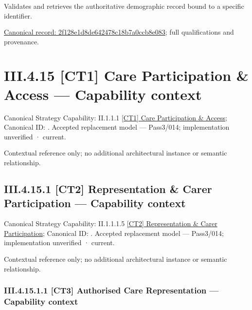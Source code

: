 Validates and retrieves the authoritative demographic record bound to a specific identifier.


{\footnotesize \href{../../../../../../../../continuum/business/business-function/2f128e1d8de642478c18b7a0ccb8e083.md}{Canonical record: 2f128e1d8de642478c18b7a0ccb8e083}; full qualifications and provenance.}\par
\section*{III.4.15 [CT1] Care Participation \& Access — Capability context}
\label{navigation:III.4.15}

{\small Canonical Strategy Capability: II.1.1.1 \hyperref[element:5b06afe075e44cc39236f628c5ada113]{[CT1] Care Participation \& Access}; Canonical ID: \texttt{}. Accepted replacement model — Pass3/014; implementation unverified · current.}\par
Contextual reference only; no additional architectural instance or semantic relationship.\par
\subsection*{III.4.15.1 [CT2] Representation \& Carer Participation — Capability context}
\label{navigation:III.4.15.1}

{\small Canonical Strategy Capability: II.1.1.1.5 \hyperref[element:0a8380fcfc2a4341927b409603a189f3]{[CT2] Representation \& Carer Participation}; Canonical ID: \texttt{}. Accepted replacement model — Pass3/014; implementation unverified · current.}\par
Contextual reference only; no additional architectural instance or semantic relationship.\par
\subsubsection*{III.4.15.1.1 [CT3] Authorised Care Representation — Capability context}
\label{navigation:III.4.15.1.1}

